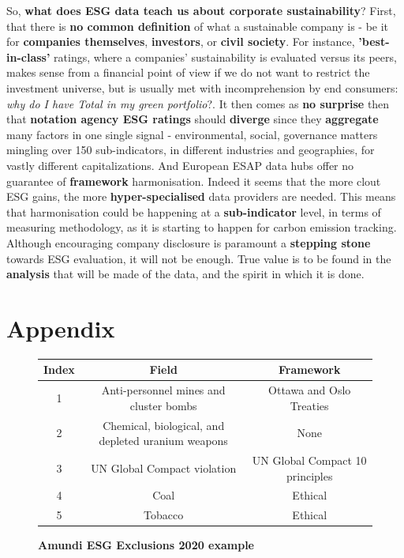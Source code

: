 \documentclass[12pt]{report}
\begin{document}
\begin{titlepage}
So, \textbf{what does ESG data teach us about corporate sustainability}?\newline
First, that there is \textbf{no common definition} of what a sustainable company is - be it for \textbf{companies themselves}, \textbf{investors}, or \textbf{civil society}. For instance, \textbf{'best-in-class'} ratings, where a companies' sustainability is evaluated versus its peers, makes sense from a financial point of view if we do not want to restrict the investment universe, but is usually met with incomprehension by end consumers: \textit{why do I have Total in my green portfolio}?. It then comes as \textbf{no surprise} then that \textbf{notation agency ESG ratings} should \textbf{diverge} since they \textbf{aggregate} many factors in one single signal - environmental, social, governance matters mingling over 150 sub-indicators, in different industries and geographies, for vastly different capitalizations.\newline
And European ESAP data hubs offer no guarantee of \textbf{framework} harmonisation. Indeed it seems that the more clout ESG gains, the more \textbf{hyper-specialised} data providers are needed. This means that harmonisation could be happening at a \textbf{sub-indicator} level, in terms of measuring methodology, as it is starting to happen for carbon emission tracking.\newline
Although encouraging company disclosure is paramount a \textbf{stepping stone} towards ESG evaluation, it will not be enough. True value is to be found in the \textbf{analysis} that will be made of the data, and the spirit in which it is done. 
\end{titlepage}




\section{Appendix}

\begin{figure}[h!]
\begin{center}
\begin{tabular}{|c|c|c|}
\hline
 Index & Field & Framework\\ 
\hline\hline
 1 & Anti-personnel mines and cluster bombs & Ottawa and Oslo Treaties\\  
\hline
 2 & Chemical, biological, and depleted uranium weapons & None\\
\hline
 3 & UN Global Compact violation & UN Global Compact 10 principles\\
\hline
 4 & Coal & Ethical\\
\hline
 5 & Tobacco & Ethical\\
\hline
\end{tabular}
\end{center}
\label{fig:amundiexample}
\caption{\textbf{Amundi ESG Exclusions 2020 example}\cite{amundi}}
\end{figure}
\end{document}
